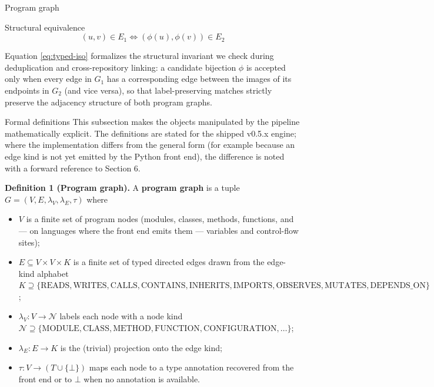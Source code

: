 \documentclass[
  ignorenonframetext,
]{beamer}
\providecommand{\tightlist}{%
  \setlength{\itemsep}{0pt}\setlength{\parskip}{0pt}}
\begin{document}
\begin{frame}[fragile]{Program graph}
\begin{block}{Structural equivalence}
\begin{equation}
\label{eq:typed-iso}
(u, v) \in E_1 \iff (\phi(u), \phi(v)) \in E_2
\end{equation}

Equation \ref{eq:typed-iso} formalizes the structural invariant we check
during deduplication and cross-repository linking: a candidate bijection
\(\phi\) is accepted only when every edge in \(G_1\) has a corresponding
edge between the images of its endpoints in \(G_2\) (and vice versa), so
that label-preserving matches strictly preserve the adjacency structure
of both program graphs.
\end{block}
\end{frame}

\begin{frame}[fragile]{Formal definitions}
\protect{}\label{formal-definitions}
This subsection makes the objects manipulated by the pipeline
mathematically explicit. The definitions are stated for the shipped
v0.5.x engine; where the implementation differs from the general form
(for example because an edge kind is not yet emitted by the Python front
end), the difference is noted with a forward reference to Section 6.

\textbf{Definition 1 (Program graph).} A \textbf{program graph} is a
tuple \(G = (V, E, \lambda_V, \lambda_E, \tau)\) where

\begin{itemize}
\tightlist
\item
  \(V\) is a finite set of program nodes (modules, classes, methods,
  functions, and --- on languages where the front end emits them ---
  variables and control-flow sites);
\item
  \(E \subseteq V \times V \times K\) is a finite set of typed directed
  edges drawn from the edge-kind alphabet
  \(K \supseteq \{\text{READS}, \text{WRITES}, \text{CALLS}, \text{CONTAINS}, \text{INHERITS}, \text{IMPORTS}, \text{OBSERVES}, \text{MUTATES}, \text{DEPENDS\_ON}\}\);
\item
  \(\lambda_V : V \to \mathcal{N}\) labels each node with a node kind
  \(\mathcal{N} \supseteq \{\text{MODULE}, \text{CLASS}, \text{METHOD}, \text{FUNCTION}, \text{CONFIGURATION}, \ldots\}\);
\item
  \(\lambda_E : E \to K\) is the (trivial) projection onto the edge
  kind;
\item
  \(\tau : V \to (T \cup \{\bot\})\) maps each node to a type annotation
  recovered from the front end or to \(\bot\) when no annotation is
  available.
\end{itemize}


\end{frame}
\end{document}
